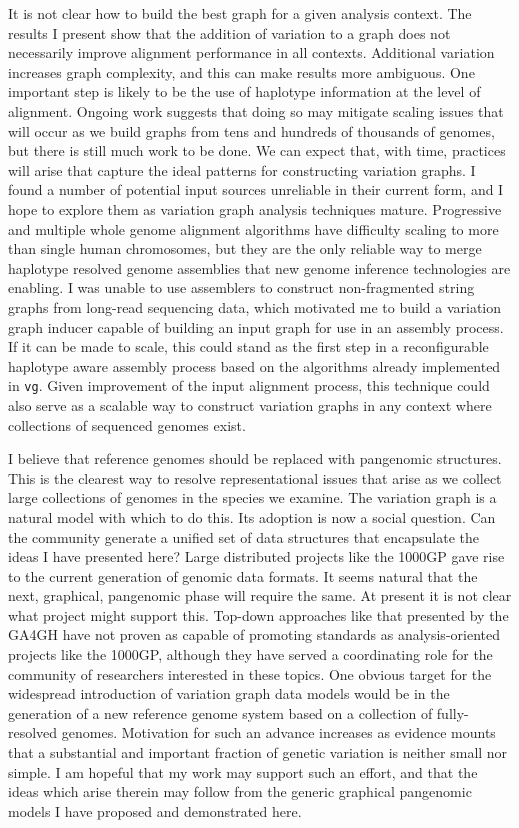 It is not clear how to build the best graph for a given analysis context.
The results I present show that the addition of variation to a graph does not necessarily improve alignment performance in all contexts.
Additional variation increases graph complexity, and this can make results more ambiguous.
One important step is likely to be the use of haplotype information at the level of alignment.
Ongoing work suggests that doing so may mitigate scaling issues that will occur as we build graphs from tens and hundreds of thousands of genomes, but there is still much work to be done.
We can expect that, with time, practices will arise that capture the ideal patterns for constructing variation graphs.
I found a number of potential input sources unreliable in their current form, and I hope to explore them as variation graph analysis techniques mature.
Progressive and multiple whole genome alignment algorithms have difficulty scaling to more than single human chromosomes, but they are the only reliable way to merge haplotype resolved genome assemblies that new genome inference technologies are enabling.
I was unable to use assemblers to construct non-fragmented string graphs from long-read sequencing data, which motivated me to build a variation graph inducer capable of building an input graph for use in an assembly process.
If it can be made to scale, this could stand as the first step in a reconfigurable haplotype aware assembly process based on the algorithms already implemented in {\tt vg}.
Given improvement of the input alignment process, this technique could also serve as a scalable way to construct variation graphs in any context where collections of sequenced genomes exist.

I believe that reference genomes should be replaced with pangenomic structures.
This is the clearest way to resolve representational issues that arise as we collect large collections of genomes in the species we examine.
The variation graph is a natural model with which to do this.
Its adoption is now a social question.
Can the community generate a unified set of data structures that encapsulate the ideas I have presented here?
Large distributed projects like the 1000GP gave rise to the current generation of genomic data formats.
It seems natural that the next, graphical, pangenomic phase will require the same.
At present it is not clear what project might support this.
Top-down approaches like that presented by the GA4GH have not proven as capable of promoting standards as analysis-oriented projects like the 1000GP, although they have served a coordinating role for the community of researchers interested in these topics.
One obvious target for the widespread introduction of variation graph data models would be in the generation of a new reference genome system based on a collection of fully-resolved genomes.
Motivation for such an advance increases as evidence mounts that a substantial and important fraction of genetic variation is neither small nor simple.
I am hopeful that my work may support such an effort, and that the ideas which arise therein may follow from the generic graphical pangenomic models I have proposed and demonstrated here.

